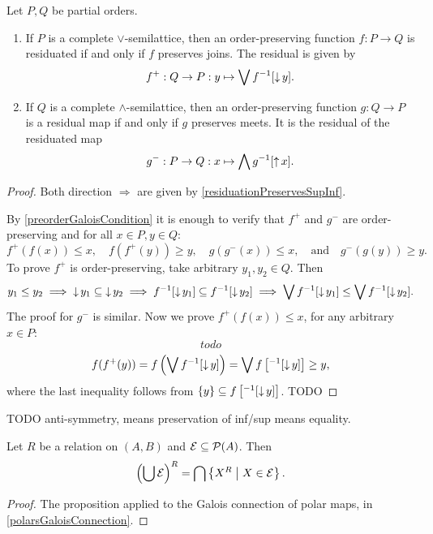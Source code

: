 \begin{proposition} \label{GaloisConnectionLatticePreservation}
Let $P, Q$ be partial orders.
\begin{enumerate}
\item If $P$ is a complete $\vee$-semilattice, then an order-preserving function $f: P\to Q$ is residuated \textup{if and only if} $f$ preserves joins. The residual is given by
\[ f^+: Q\to P: y\mapsto \bigvee f^{-1}[\operatorname{\downarrow} y]. \]
\item If $Q$ is a complete $\wedge$-semilattice, then an order-preserving function $g: Q\to P$ is a residual map \textup{if and only if} $g$ preserves meets. It is the residual of the residuated map
\[ g^-: P\to Q: x\mapsto \bigwedge g^{-1}[\operatorname{\uparrow} x]. \]
\end{enumerate}
\end{proposition}
\begin{proof}
Both direction $\Rightarrow$ are given by \ref{residuationPreservesSupInf}.

By \ref{preorderGaloisCondition} it is enough to verify that $f^+$ and $g^-$ are order-preserving and for all $x\in P, y\in Q$:
\[ f^+(f(x)) \leq x, \quad f(f^+(y)) \geq y, \quad g(g^-(x)) \leq x, \quad\text{and}\quad g^-(g(y)) \geq y. \]
To prove $f^+$ is order-preserving, take arbitrary $y_1,y_2\in Q$. Then
\[ y_1 \leq y_2 \implies \operatorname{\downarrow} y_1 \subseteq \operatorname{\downarrow} y_2 \implies f^{-1}[\operatorname{\downarrow} y_1] \subseteq f^{-1}[\operatorname{\downarrow} y_2] \implies \bigvee f^{-1}[\operatorname{\downarrow} y_1] \leq \bigvee f^{-1}[\operatorname{\downarrow} y_2]. \]
The proof for $g^-$ is similar. Now we prove $f^+(f(x)) \leq x$, for any arbitrary $x\in P$:
\[ todo \]
\[ f(f^{+}(y)) = f\left(\bigvee f^{-1}[\operatorname{\downarrow} y]\right) = \bigvee f\left[^{-1}[\operatorname{\downarrow} y]\right] \geq y, \]
where the last inequality follows from $\{y\} \subseteq f\left[^{-1}[\operatorname{\downarrow} y]\right]$.
TODO
\end{proof}
TODO anti-symmetry, means preservation of inf/sup means equality.

\begin{corollary} \label{polarOfUnion}
Let $R$ be a relation on $(A,B)$ and $\mathcal{E}\subseteq \operatorname{\mathcal{P}}(A)$. Then
\[ \left(\bigcup\mathcal{E}\right)^R = \bigcap\left\{ {X^R} \;\middle|\; X\in \mathcal{E} \right\}. \]
\end{corollary}
\begin{proof}
The proposition applied to the Galois connection of polar maps, in \ref{polarsGaloisConnection}.
\end{proof}

